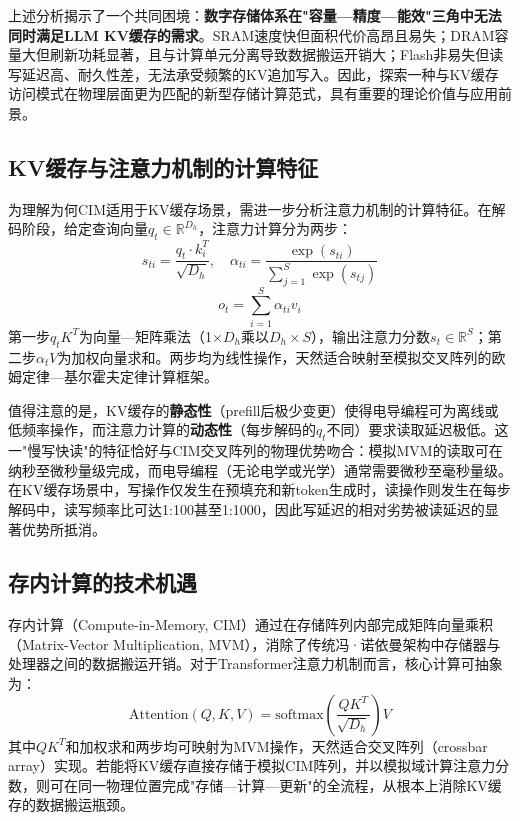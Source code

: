 上述分析揭示了一个共同困境：\textbf{数字存储体系在"容量—精度—能效"三角中无法同时满足LLM KV缓存的需求}。SRAM速度快但面积代价高昂且易失；DRAM容量大但刷新功耗显著，且与计算单元分离导致数据搬运开销大；Flash非易失但读写延迟高、耐久性差，无法承受频繁的KV追加写入。因此，探索一种与KV缓存访问模式在物理层面更为匹配的新型存储计算范式，具有重要的理论价值与应用前景。

\subsection{KV缓存与注意力机制的计算特征}

为理解为何CIM适用于KV缓存场景，需进一步分析注意力机制的计算特征。在解码阶段，给定查询向量$q_t \in \mathbb{R}^{D_h}$，注意力计算分为两步：
\begin{equation}
s_{ti} = \frac{q_t \cdot k_i^T}{\sqrt{D_h}}, \quad \alpha_{ti} = \frac{\exp(s_{ti})}{\sum_{j=1}^{S} \exp(s_{tj})}
\label{eq:attention_scores}
\end{equation}
\begin{equation}
o_t = \sum_{i=1}^{S} \alpha_{ti} v_i
\label{eq:attention_output_detail}
\end{equation}
第一步$q_t K^T$为向量—矩阵乘法（1$\times D_h$乘以$D_h \times S$），输出注意力分数$s_t \in \mathbb{R}^S$；第二步$\alpha_t V$为加权向量求和。两步均为线性操作，天然适合映射至模拟交叉阵列的欧姆定律—基尔霍夫定律计算框架。

值得注意的是，KV缓存的\textbf{静态性}（prefill后极少变更）使得电导编程可为离线或低频率操作，而注意力计算的\textbf{动态性}（每步解码的$q_t$不同）要求读取延迟极低。这一"慢写快读"的特征恰好与CIM交叉阵列的物理优势吻合：模拟MVM的读取可在纳秒至微秒量级完成，而电导编程（无论电学或光学）通常需要微秒至毫秒量级。在KV缓存场景中，写操作仅发生在预填充和新token生成时，读操作则发生在每步解码中，读写频率比可达1:100甚至1:1000，因此写延迟的相对劣势被读延迟的显著优势所抵消。

\subsection{存内计算的技术机遇}

存内计算（Compute-in-Memory, CIM）通过在存储阵列内部完成矩阵向量乘积（Matrix-Vector Multiplication, MVM），消除了传统冯·诺依曼架构中存储器与处理器之间的数据搬运开销。对于Transformer注意力机制而言，核心计算可抽象为：
\begin{equation}
\text{Attention}(Q, K, V) = \text{softmax}\left(\frac{QK^T}{\sqrt{D_h}}\right)V
\label{eq:attention}
\end{equation}
其中$QK^T$和加权求和两步均可映射为MVM操作，天然适合交叉阵列（crossbar array）实现。若能将KV缓存直接存储于模拟CIM阵列，并以模拟域计算注意力分数，则可在同一物理位置完成"存储—计算—更新"的全流程，从根本上消除KV缓存的数据搬运瓶颈。

